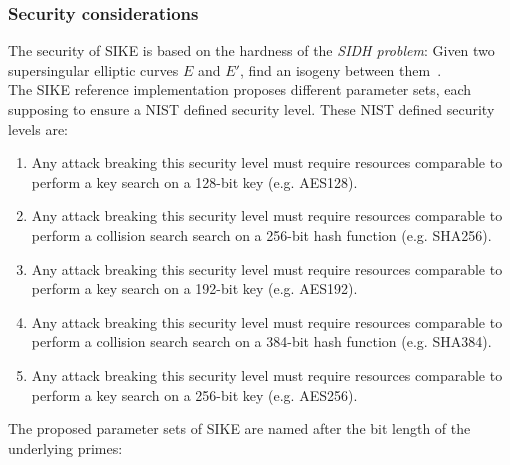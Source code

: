 \subsubsection{Security considerations}
The security of SIKE is based on the hardness of the \textit{SIDH problem}: Given two supersingular elliptic curves $E$ and $E'$, find an isogeny between them~\parencite{sike2020spec}. 
\\
The SIKE reference implementation proposes different parameter sets, each supposing to ensure a NIST defined security level. These NIST defined security levels are:
\begin{enumerate}
	\item Any attack breaking this security level must require resources comparable to perform a key search on a 128-bit key (e.g. AES128).
	\item Any attack breaking this security level must require resources comparable to perform a collision search search on a 256-bit hash function (e.g. SHA256).
	\item Any attack breaking this security level must require resources comparable to perform a key search on a 192-bit key (e.g. AES192).
	\item Any attack breaking this security level must require resources comparable to perform a collision search search on a 384-bit hash function (e.g. SHA384).
	\item Any attack breaking this security level must require resources comparable to perform a key search on a 256-bit key (e.g. AES256).
\end{enumerate}
The proposed parameter sets of SIKE are named after the bit length of the underlying primes:

